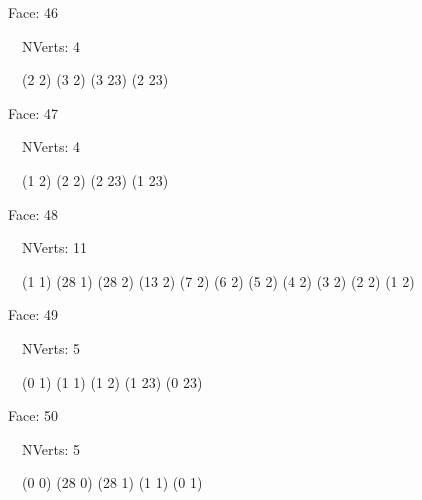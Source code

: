 \documentclass{article}
\begin{document}
{\footnotesize 

Face: 46

\   \    NVerts: 4

 \   \   (2 2) (3 2) (3 23) (2 23)}

{\footnotesize 

Face: 47

\   \    NVerts: 4

 \   \   (1 2) (2 2) (2 23) (1 23)}

{\footnotesize 

Face: 48

\   \    NVerts: 11

 \   \   (1 1) (28 1) (28 2) (13 2) (7 2) (6 2) (5 2) (4 2) (3 2) (2 2) (1 2)}

{\footnotesize 

Face: 49

\   \    NVerts: 5

 \   \   (0 1) (1 1) (1 2) (1 23) (0 23)}

{\footnotesize 

Face: 50

\   \    NVerts: 5

 \   \   (0 0) (28 0) (28 1) (1 1) (0 1)}


 \newpage
\end{document}
